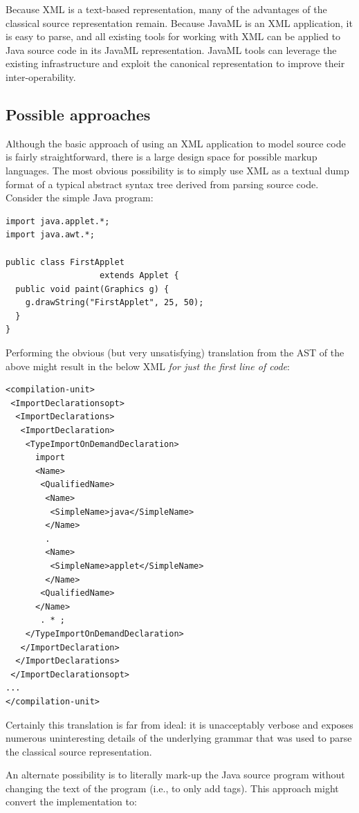 \documentclass{article}
\begin{document}
\begin{multicols}{2}
Because XML is a text-based representation,
many of the advantages of the classical source representation remain.
Because JavaML is an XML application, it is easy to parse, and all
existing tools for working with XML can be applied to Java source code
in its JavaML representation.  JavaML tools can leverage the existing
infrastructure and exploit the canonical representation to improve
their inter-operability.

\subsection{Possible approaches}

Although the basic approach of using an XML application to model source
code is fairly straightforward, there is a large design space for
possible markup languages.  The most obvious possibility is to simply
use XML as a textual dump format of a typical abstract syntax tree
derived from parsing source code.  Consider the simple Java program:

\begin{verbatim}
import java.applet.*;
import java.awt.*;

public class FirstApplet 
                   extends Applet {
  public void paint(Graphics g) {
    g.drawString("FirstApplet", 25, 50);
  }
}
\end{verbatim}

Performing the obvious (but very unsatisfying) translation from the AST
of the above might result in the below XML \emph{for just the first line
  of code}:

\begin{verbatim}
<compilation-unit>
 <ImportDeclarationsopt>
  <ImportDeclarations>
   <ImportDeclaration>
    <TypeImportOnDemandDeclaration>
      import
      <Name>
       <QualifiedName>
        <Name>
         <SimpleName>java</SimpleName>
        </Name>
        .
        <Name>
         <SimpleName>applet</SimpleName>
        </Name>
       <QualifiedName>
      </Name>
       . * ;
    </TypeImportOnDemandDeclaration>
   </ImportDeclaration>
  </ImportDeclarations>
 </ImportDeclarationsopt>
...
</compilation-unit>
\end{verbatim}

Certainly this translation is far from ideal: it is unacceptably
verbose and exposes numerous uninteresting details of the underlying
grammar that was used to parse the classical source
representation.  

An alternate possibility is to literally mark-up the Java source program
without changing the text of the program (i.e., to only add tags).  This
approach might convert the  implementation
to:


\end{multicols}
\end{document}
